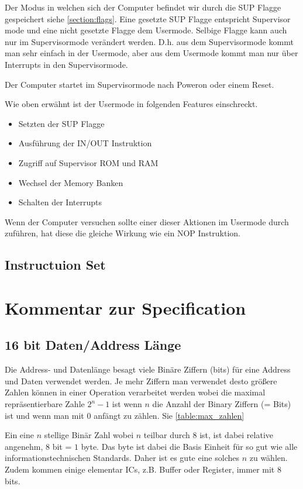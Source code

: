 \documentclass{scrartcl}
\begin{document}
Der Modus in welchen sich der Computer befindet wir durch die SUP Flagge gespeichert siehe \autoref{section:flags}. Eine gesetzte SUP Flagge entspricht Supervisor mode und eine nicht gesetzte Flagge dem Usermode. Selbige Flagge kann auch nur im Supervisormode verändert werden. D.h. aus dem Supervisormode kommt man sehr einfach in der Usermode, aber aus dem Usermode kommt man nur über Interrupts in den Supervisormode.

Der Computer startet im Supervisormode nach Poweron oder einem Reset.

Wie oben erwähnt ist der Usermode in folgenden Features einschreckt.

\begin{itemize}
	\item Setzten der SUP Flagge
	\item Ausführung der IN/OUT Instruktion
	\item Zugriff auf Supervisor ROM und RAM
	\item Wechsel der Memory Banken
	\item Schalten der Interrupts
\end{itemize}

Wenn der Computer versuchen sollte einer dieser Aktionen im Usermode durch zuführen, hat diese die gleiche Wirkung wie ein NOP Instruktion.

\subsection{\label{section:insSet}Instructuion Set}

\section{Kommentar zur Specification}

\subsection{16 bit Daten/Address Länge}
Die Address- und Datenlänge besagt viele Binäre Ziffern (bits) für eine Address und Daten verwendet werden. Je mehr Ziffern man verwendet desto größere Zahlen können in einer Operation verarbeitet werden wobei die maximal repräsentierbare Zahle $2^n - 1$ ist wenn $n$ die Anzahl der Binary Ziffern (= Bits) ist und wenn man mit $0$ anfängt zu zählen. Sie \autoref{table:max_zahlen}

Ein eine $n$ stellige Binär Zahl wobei $n$ teilbar durch $8$ ist, ist dabei relative angenehm, $8$ bit = $1$ byte. Das byte ist dabei die Basis Einheit für so gut wie alle informationstechnischen Standards. Daher ist es gute eine solches $n$ zu wählen.
Zudem kommen einige elementar ICs, z.B. Buffer oder Register, immer mit 8 bits.
\end{document}

